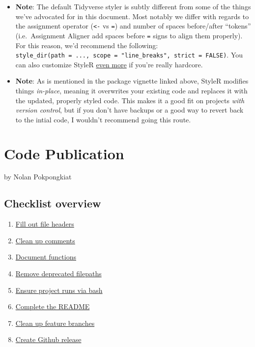 \documentclass[]{book}
\providecommand{\tightlist}{%
  \setlength{\itemsep}{0pt}\setlength{\parskip}{0pt}}
\begin{document}
\begin{enumerate}
  \begin{itemize}
  \tightlist
  \item
    \textbf{Note}: The default Tidyverse styler is subtly different from
    some of the things we've advocated for in this document. Most
    notably we differ with regards to the assignment operator
    (\texttt{\textless{}-} vs \texttt{=}) and number of spaces
    before/after ``tokens'' (i.e.~Assignment Aligner add spaces before
    \texttt{=} signs to align them properly). For this reason, we'd
    recommend the following:
    \texttt{style\_dir(path\ =\ ...,\ scope\ =\ "line\_breaks",\ strict\ =\ FALSE)}.
    You can also customize StyleR
    \href{http://styler.r-lib.org/articles/customizing_styler.html}{even
    more} if you're really hardcore.
  \item
    \textbf{Note}: As is mentioned in the package vignette linked above,
    StyleR modifies things \emph{in-place}, meaning it overwrites your
    existing code and replaces it with the updated, properly styled
    code. This makes it a good fit on projects \emph{with version
    control}, but if you don't have backups or a good way to revert back
    to the intial code, I wouldn't recommend going this route.
  \end{itemize}
\end{enumerate}

\chapter{Code Publication}\label{code-publication}

by Nolan Pokpongkiat

\section{Checklist overview}\label{checklist-overview}

\begin{enumerate}
\def\labelenumi{\arabic{enumi}.}
\tightlist
\item
  \protect\hyperlink{fill-out-file-headers}{Fill out file headers}
\item
  \protect\hyperlink{clean-up-comments}{Clean up comments}
\item
  \protect\hyperlink{document-functions}{Document functions}
\item
  \protect\hyperlink{remove-deprecated-filepaths}{Remove deprecated
  filepaths}
\item
  \protect\hyperlink{ensure-project-runs-via-bash}{Ensure project runs
  via bash}
\item
  \protect\hyperlink{complete-the-readme}{Complete the README}
\item
  \protect\hyperlink{clean-up-feature-branches}{Clean up feature
  branches}
\item
  \protect\hyperlink{create-github-release}{Create Github release}
\end{enumerate}
\end{document}
